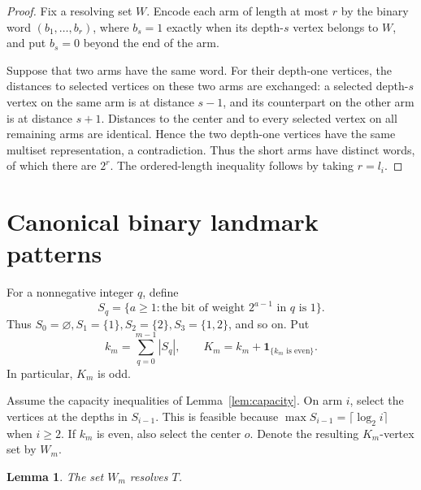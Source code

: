 \documentclass[11pt]{amsart}
\newtheorem{lemma}[theorem]{Lemma}
\theoremstyle{definition}
\begin{document}
\begin{proof}
Fix a resolving set \(W\).  Encode each arm of length at most \(r\) by the
binary word \((b_1,\ldots,b_r)\), where \(b_s=1\) exactly when its depth-\(s\)
vertex belongs to \(W\), and put \(b_s=0\) beyond the end of the arm.

Suppose that two arms have the same word.  For their depth-one vertices, the
distances to selected vertices on these two arms are exchanged: a selected
depth-\(s\) vertex on the same arm is at distance \(s-1\), and its counterpart
on the other arm is at distance \(s+1\).  Distances to the center and to every
selected vertex on all remaining arms are identical.  Hence the two
depth-one vertices have the same multiset representation, a contradiction.
Thus the short arms have distinct words, of which there are \(2^r\).
The ordered-length inequality follows by taking \(r=l_i\).
\end{proof}

\section{Canonical binary landmark patterns}

For a nonnegative integer \(q\), define
\[
 S_q=\{a\ge1:\text{the bit of weight }2^{a-1}\text{ in }q\text{ is }1\}.
\]
Thus \(S_0=\varnothing,S_1=\{1\},S_2=\{2\},S_3=\{1,2\}\), and so on.
Put
\[
 k_m=\sum_{q=0}^{m-1}|S_q|,
 \qquad
 K_m=k_m+\mathbf 1_{\{k_m\text{ is even}\}}.
\]
In particular, \(K_m\) is odd.

Assume the capacity inequalities of Lemma~\ref{lem:capacity}.  On arm \(i\),
select the vertices at the depths in \(S_{i-1}\).  This is feasible because
\(\max S_{i-1}=\lceil\log_2i\rceil\) when \(i\ge2\).  If \(k_m\) is even,
also select the center \(o\).  Denote the resulting \(K_m\)-vertex set by
\(W_m\).

\begin{lemma}\label{lem:binary-resolves}
The set \(W_m\) resolves \(T\).
\end{lemma}
\end{document}
